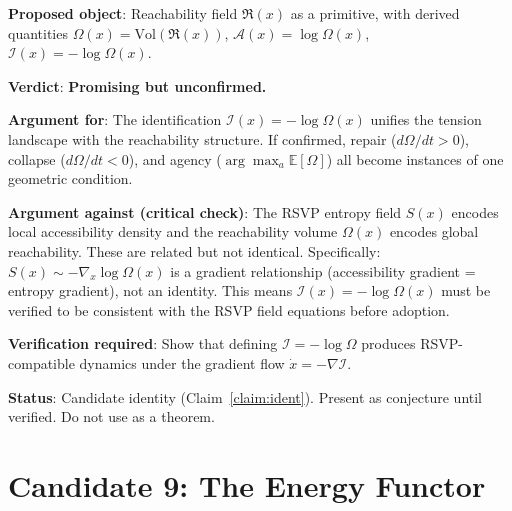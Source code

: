 \documentclass[11pt, a4paper]{book}
\theoremstyle{flyxion}
\theoremstyle{remark}
\begin{document}
\begin{flybox}
\textbf{Proposed object}: Reachability field $\mathfrak{R}(x)$
as a primitive, with derived quantities $\Omega(x) =
\mathrm{Vol}(\mathfrak{R}(x))$, $\mathcal{A}(x) = \log\Omega(x)$,
$\mathcal{I}(x) = -\log\Omega(x)$.

\textbf{Verdict}: \textbf{Promising but unconfirmed.}

\textbf{Argument for}: The identification $\mathcal{I}(x) =
-\log\Omega(x)$ unifies the tension landscape with the reachability
structure. If confirmed, repair ($d\Omega/dt > 0$), collapse
($d\Omega/dt < 0$), and agency ($\arg\max_a \mathbb{E}[\Omega]$)
all become instances of one geometric condition.

\textbf{Argument against (critical check)}: The RSVP entropy field
$S(x)$ encodes local accessibility density and the reachability
volume $\Omega(x)$ encodes global reachability. These are related
but not identical. Specifically:
$S(x) \sim -\nabla_x\log\Omega(x)$ is a gradient relationship
(accessibility gradient = entropy gradient), not an identity.
This means $\mathcal{I}(x) = -\log\Omega(x)$ must be verified
to be consistent with the RSVP field equations before adoption.

\textbf{Verification required}: Show that defining $\mathcal{I} =
-\log\Omega$ produces RSVP-compatible dynamics under the gradient
flow $\dot{x} = -\nabla\mathcal{I}$.

\textbf{Status}: Candidate identity (Claim~\ref{claim:ident}).
Present as conjecture until verified. Do not use as a theorem.
\end{flybox}

\section{Candidate 9: The Energy Functor}
\end{document}
